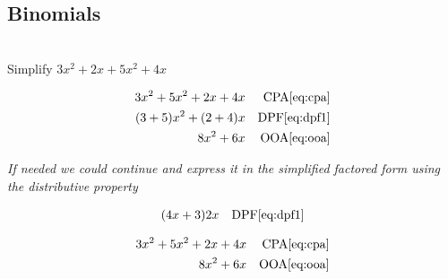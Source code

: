 \documentclass[20150903-160354-rs2.2-MarksMathNotebook.tex]{subfiles}
\begin{document}
\subsection*{Binomials}

\begin{example}[id:20141106-152339] \label{20141106-152339}  \hfill \\

Simplify $3x^2+2x+5x^2+4x$

\soln

\solnsteps
\begin{align*}
3x^2+5x^2+2x+4x && \text{CPA} \eqref{eq:cpa} \\
(3+5)x^2+(2+4)x && \text{DPF} \eqref{eq:dpf1} \\
8x^2+6x && \text{OOA} \eqref{eq:ooa}
\end{align*}

\emph{If needed we could continue and express it in the simplified factored form using the distributive property}

\begin{align*}
(4x+3)2x && \text{DPF} \eqref{eq:dpf1} \\
\end{align*}

\soln

\lesssteps
\begin{align*}
3x^2 + 5x^2 + 2x + 4x && \text{CPA} \eqref{eq:cpa} \\
8x^2+6x && \text{OOA} \eqref{eq:ooa}
\end{align*}
\end{example}
\end{document}
